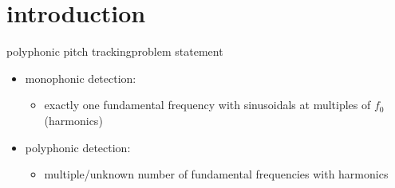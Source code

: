     \section[intro]{introduction}
        \begin{frame}{polyphonic pitch tracking}{problem statement}
            \begin{itemize}
                \item monophonic detection:
                    \begin{itemize}
                        \item   exactly one fundamental frequency with sinusoidals at multiples of $f_0$ (harmonics)
                    \end{itemize}
                \item   polyphonic detection:
                    \begin{itemize}
                        \item   multiple/unknown number of fundamental frequencies with harmonics
                    \end{itemize}
            \end{itemize}
        \end{frame}
